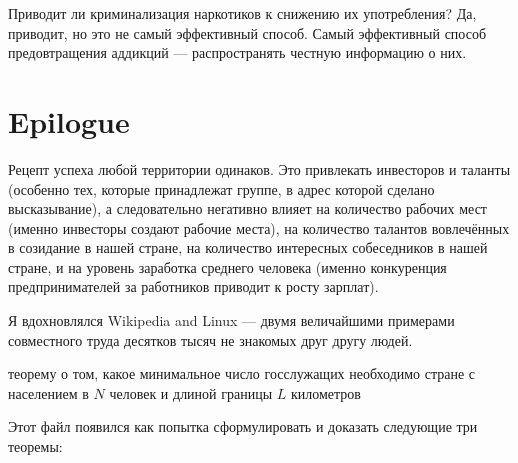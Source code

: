 \documentclass[11pt]{article}
\theoremstyle{remark}
\theoremstyle{definition}
\begin{document}

Приводит ли криминализация наркотиков к снижению их употребления? Да, приводит, но это не самый эффективный способ. Самый эффективный способ предовтращения аддикций --- распространять честную информацию о них.
























\section{Epilogue}



Рецепт успеха любой территории одинаков. Это привлекать инвесторов и таланты (особенно тех, которые принадлежат группе, в адрес которой сделано высказывание), а следовательно негативно влияет на количество рабочих мест (именно инвесторы создают рабочие места), на количество талантов вовлечённых в созидание в нашей стране, на количество интересных собеседников в нашей стране, и на уровень заработка среднего человека (именно конкуренция предпринимателей за работников приводит к росту зарплат).



Я вдохновлялся Wikipedia and Linux --- двумя величайшими примерами совместного труда десятков тысяч не знакомых друг другу людей.


теорему о том, какое минимальное число госслужащих необходимо стране с населением в $N$ человек и длиной границы $L$ километров




Этот файл появился как попытка сформулировать и доказать следующие три теоремы:
\end{document}
